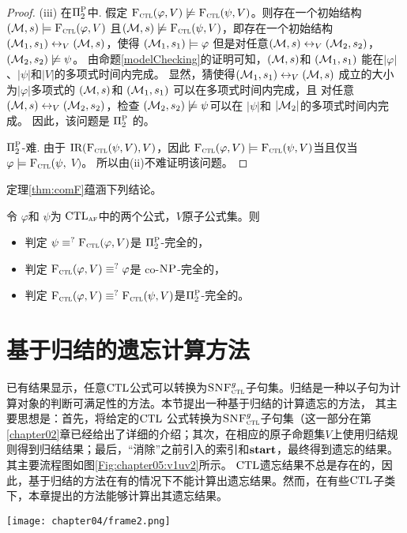 \begin{proof}
	(iii) 在$\Pi_2^{\textsc{P}}$中. 假定 ${\textsc{F}_{\textsc{ctl}}}(\varphi, V) \not \models {\textsc{F}_{\textsc{ctl}}}(\psi, V)$。则存在一个初始结构 $({\cal M},s)
	\models {\textsc{F}_{\textsc{ctl}}}(\varphi, V)$ 且$({\cal M},s) \not \models {\textsc{F}_{\textsc{ctl}}}(\psi, V)$，即存在一个初始结构$({\cal M}_1,s_1) \leftrightarrow_V ({\cal M},s)$，使得 $({\cal M}_1, s_1) \models \varphi$ 但是对任意$({\cal M}, s) \leftrightarrow_V ({\cal M}_2,s_2)$，$({\cal M}_2, s_2) \not \models \psi$。
	由命题\ref{modelChecking}的证明可知，$({\cal M},s)$和 $({\cal M}_1,s_1)$ 能在$|\varphi|$、$|\psi|$和$|V|$的多项式时间内完成。
	显然，猜使得$({\cal M}_1,s_1) \leftrightarrow_V ({\cal M},s)$ 成立的大小为$|\varphi|$多项式的 $({\cal M},s)$和 $({\cal M}_1,s_1)$ 可以在多项式时间内完成，且 对任意 $({\cal M}, s) \leftrightarrow_V ({\cal M}_2,s_2)$，检查 $({\cal M}_2,s_2) \not \models \psi$可以在 $|\psi|$和 $|{\cal M}_2|$的多项式时间内完成。
	因此，该问题是 $\Pi_2^{\textsc{P}}$ 的。
	
	$\Pi_2^{\textsc{P}}$-难. 由于 $\textrm{IR}({\textsc{F}_{\textsc{ctl}}}(\psi, V), V)$，因此 ${\textsc{F}_{\textsc{ctl}}}(\varphi, V) \models {\textsc{F}_{\textsc{ctl}}}(\psi, V)$当且仅当 $\varphi \models {\textsc{F}_{\textsc{ctl}}}(\psi,$ $V)$。 所以由(ii)不难证明该问题。
\end{proof}



定理\ref{thm:comF}蕴涵下列结论。
\begin{corollary}
	令 $\varphi$和 $\psi$为 $\textrm{CTL}_{\textsc{a} \textsc{f}}$中的两个公式，$V$原子公式集。则
	\begin{itemize}
		\item[(i)] 判定 $\psi \equiv^?{\textsc{F}_{\textsc{ctl}}}(\varphi, V)$是 $\Pi_2^{\textsc{P}}$-完全的，
		\item[(ii)] 判定 ${\textsc{F}_{\textsc{ctl}}}(\varphi, V) \equiv^? \varphi$是 co-$\textsc{NP}$-完全的，
		\item[(iii)] 判定 ${\textsc{F}_{\textsc{ctl}}}(\varphi, V) \equiv^? {\textsc{F}_{\textsc{ctl}}}(\psi, V)$是$\Pi_2^{\textsc{P}}$-完全的。
	\end{itemize}
\end{corollary}






\section{基于归结的遗忘计算方法}
\label{chapter05:sec:resolution}
	已有结果显示，任意$\textrm{CTL}$公式可以转换为${\textsc{SNF}_{\textsc{ctl}}^g}$子句集。归结是一种以子句为计算对象的判断可满足性的方法。本节提出一种基于归结的计算遗忘的方法，
	其主要思想是：首先，将给定的$\textrm{CTL}$ 公式转换为${\textsc{SNF}_{\textsc{ctl}}^g}$子句集（这一部分在第\ref{chapter02}章已经给出了详细的介绍；其次，在相应的原子命题集$V$上使用归结规则得到归结结果；最后，“消除”之前引入的索引和$\textbf{start}$，最终得到遗忘的结果。其主要流程图如图\ref{Fig:chapter05:v1uv2}所示。
	$\textrm{CTL}$遗忘结果不总是存在的，因此，基于归结的方法在有的情况下不能计算出遗忘结果。然而，在有些$\textrm{CTL}$子类下，本章提出的方法能够计算出其遗忘结果。
\begin{figure*}[!htb]
	\centering
	\texttt{[image: chapter04/frame2.png]}\\
	\caption{基于归结的遗忘的主要流程图}
	\label{Fig:chapter05:v1uv2}
\end{figure*}

